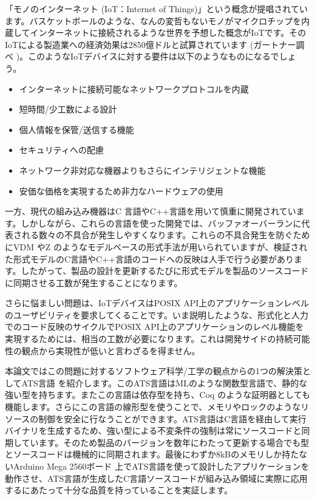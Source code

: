 \documentclass{ipsjprosym}
\begin{document}
「モノのインターネット (IoT：Internet of Things)」という概念が提唱されています。バスケットボールのような、なんの変哲もないモノがマイクロチップを内蔵してインターネットに接続されるような世界を予想した概念がIoTです。そのIoTによる製造業への経済効果は2850億ドルと試算されています (ガートナー調べ \cite{iot_monoist})。このようなIoTデバイスに対する要件は以下のようなものになるでしょう。

\begin{itemize}
\item インターネットに接続可能なネットワークプロトコルを内蔵
\item 短時間/少工数による設計
\item 個人情報を保管/送信する機能
\item セキュリティへの配慮
\item ネットワーク非対応な機器よりもさらにインテリジェントな機能
\item 安価な価格を実現するため非力なハードウェアの使用
\end{itemize}

一方、現代の組み込み機器はC 言語やC++言語を用いて慎重に開発されています。しかしながら、これらの言語を使った開発では、バッファオーバーランに代表される数々の不具合が発生しやすくなります。これらの不具合発生を防ぐためにVDM \cite{vdm} やZ \cite{z_notation} のようなモデルベースの形式手法が用いられていますが、検証された形式モデルのC言語やC++言語のコードへの反映は人手で行う必要があります。したがって、製品の設計を更新するたびに形式モデルを製品のソースコードに同期させる工数が発生することになります。

さらに悩ましい問題は、IoTデバイスはPOSIX API上のアプリケーションレベルのユーザビリティを要求してくることです。いま説明したような、形式化と人力でのコード反映のサイクルでPOSIX API上のアプリケーションのレベル機能を実現するためには、相当の工数が必要になります。これは開発サイドの持続可能性の観点から実現性が低いと言わざるを得ません。

本論文ではこの問題に対するソフトウェア科学/工学の観点からの1つの解決策としてATS言語 \cite{ats} を紹介します。このATS言語はMLのような関数型言語で、静的な強い型を持ちます。またこの言語は依存型を持ち、Coq \cite{Coq_manual} のような証明器としても機能します。さらにこの言語の線形型を使うことで、メモリやロックのようなリソースの制御を安全に行なうことができます。ATS言語はC言語を経由して実行バイナリを生成するため、強い型による不変条件の強制は常にソースコードと同期しています。そのため製品のバージョンを数年にわたって更新する場合でも型とソースコードは機械的に同期されます。最後にわずか8kBのメモリしか持たないArduino Mega 2560ボード \cite{arduino-mega} 上でATS言語を使って設計したアプリケーションを動作させ、ATS言語が生成したC言語ソースコードが組み込み領域に実際に応用するにあたって十分な品質を持っていることを実証します。
\end{document}
